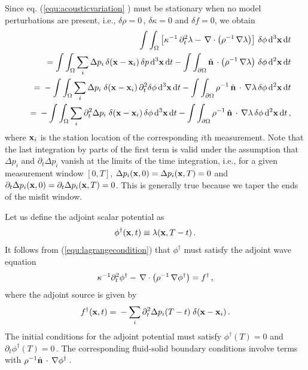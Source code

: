 \documentclass[referee,extra]{gji}
\newcommand{\bequ}{\begin{equation} }
\newcommand{\eequ}{\end{equation} }
\newcommand{\barr}{\begin{eqnarray} }
\newcommand{\earr}{\end{eqnarray} }
\newcommand{\bnabla}{ \, {\bf \nabla } }
\newcommand{\bx}{ {\bf x } }
\newcommand{\bnormal}{ \hat{ \bf{n} } \, }
\begin{document}
\begin{appendices}
Since eq. (\ref{equ:acousticvariation} ) must be stationary when no model perturbations are present,
i.e., $\delta\rho = 0$\,, $ \delta\kappa= 0$ and $ \delta f = 0$,  we obtain
\barr \label{equ:lagrangecondition}
&& \int \int_{\Omega} \left[ \kappa^{-1} \, \partial_t^2 \lambda - \bnabla \cdot \left( \rho^{-1} \bnabla \lambda \right) \right]\, \delta \phi \, \mathrm{d}^3\bx \, \mathrm{d}t  \nonumber \\
&& \mbox{} = \int \int_{\Omega}  \sum_i \Delta p_i \,   \delta( \bx - \bx_{i} ) \, \delta p \, \mathrm{d}^3\bx \, \mathrm{d}t
- \int \int_{ \partial \Omega} \bnormal \cdot \left( \rho^{-1} \bnabla \lambda \right) \,\delta \phi \, \mathrm{d}^2\bx \,\mathrm{d}t \nonumber \\
&& \mbox{} = \mbox{}-\int \int_{\Omega}  \sum_i \Delta p_i \;  \delta( \bx - \bx_{i} ) \,  \partial_t^2 \delta \phi  \, \mathrm{d}^3\bx \, \mathrm{d}t
- \int \int_{ \partial \Omega} \rho^{-1}\,\bnormal \cdot \bnabla \lambda\, \delta \phi \, \mathrm{d}^2\bx \, \mathrm{d}t \nonumber \\
&& \mbox{} = \mbox{}-\int \int_{\Omega}  \sum_i \partial_t^2\Delta p_i \;  \delta( \bx - \bx_{i} ) \,\delta \phi \, \mathrm{d}^3\bx \, \mathrm{d}t
- \int \int_{ \partial \Omega} \rho^{-1} \,\bnormal \cdot \bnabla \lambda \, \delta \phi \, \mathrm{d}^2\bx \, \mathrm{d}t\,,
\earr
where $\bx_{i}$ is the station location of the corresponding $i$th measurement.
Note that the last integration by parts of the first term
is valid under the assumption that $\Delta p_i$ and $ \partial_t \Delta p_i $ vanish at the limits of the time integration,
i.e., for a given measurement window $[0,T]$, $ \Delta p_i ( \bx, 0 ) = \Delta p_i ( \bx, T ) = 0 $ and $ \partial_t \Delta p_i ( \bx , 0 ) = \partial_t \Delta p_i ( \bx , T ) = 0 $.
This is generally true because we taper the ends of the misfit window.

Let us define the adjoint scalar potential as
\bequ
\phi^\dag ( \bx , t ) \equiv \lambda (\bx , T - t )\, .
\eequ
It follows from (\ref{equ:lagrangecondition}) that $\phi^\dag$ must satisfy the adjoint wave equation
\bequ
\kappa^{-1}  \partial_t^2 \phi^\dag - \bnabla \cdot \left( \rho^{-1} \bnabla \phi^\dag \right)
= f^\dag \,,
\eequ
where the adjoint source is given by
\bequ
f^\dag ( \bx, t) = \mbox{}- \sum_i  \partial_t^2 \Delta p_i(T-t )  \;  \delta( \bx - \bx_{i} ) \,.
\eequ
The initial conditions for the adjoint potential must satisfy $\phi^\dag (T ) = 0 $ and $\partial_t \phi^\dag (T ) = 0$\,.
The corresponding fluid-solid boundary conditions involve terms with $ \rho^{-1} \bnormal \cdot \bnabla\phi^\dag$\,.


\end{appendices}
\end{document}
